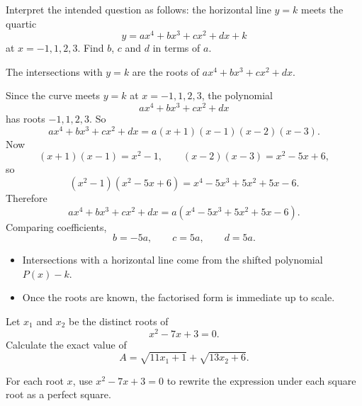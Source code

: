 
\begin{problem}
Interpret the intended question as follows: the horizontal line $y=k$ meets the quartic
\[
y=ax^4+bx^3+cx^2+dx+k
\]
at $x=-1,1,2,3$. Find $b$, $c$ and $d$ in terms of $a$.
\end{problem}

\begin{hintbox}
The intersections with $y=k$ are the roots of $ax^4+bx^3+cx^2+dx$.
\end{hintbox}

\begin{solution}
Since the curve meets $y=k$ at $x=-1,1,2,3$, the polynomial
\[
ax^4+bx^3+cx^2+dx
\]
has roots $-1,1,2,3$. So
\[
ax^4+bx^3+cx^2+dx=a(x+1)(x-1)(x-2)(x-3).
\]
Now
\[
(x+1)(x-1)=x^2-1,\qquad (x-2)(x-3)=x^2-5x+6,
\]
so
\[
(x^2-1)(x^2-5x+6)=x^4-5x^3+5x^2+5x-6.
\]
Therefore
\[
ax^4+bx^3+cx^2+dx=a(x^4-5x^3+5x^2+5x-6).
\]
Comparing coefficients,
\[
\boxed{b=-5a,\qquad c=5a,\qquad d=5a.}
\]
\end{solution}

\begin{takeaways}
\begin{itemize}[leftmargin=*]
\item Intersections with a horizontal line come from the shifted polynomial $P(x)-k$.
\item Once the roots are known, the factorised form is immediate up to scale.
\end{itemize}
\end{takeaways}

\begin{problem}
Let $x_1$ and $x_2$ be the distinct roots of
\[
x^2-7x+3=0.
\]
Calculate the exact value of
\[
A=\sqrt{11x_1+1}+\sqrt{13x_2+6}.
\]
\end{problem}

\begin{hintbox}
For each root $x$, use $x^2-7x+3=0$ to rewrite the expression under each square root as a perfect square.
\end{hintbox}

